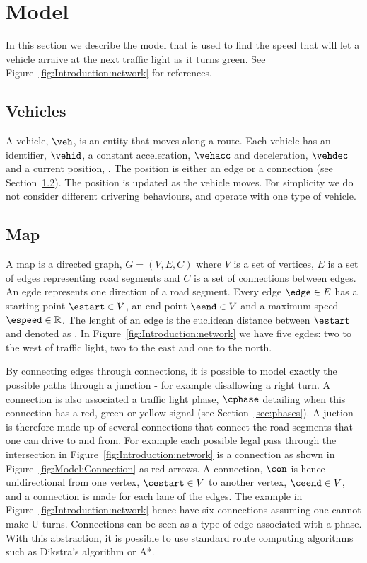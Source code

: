 \section{Model}\label{sec:Model}
In this section we describe the model that is used to find the speed that will let a vehicle arraive at the next traffic light as it turns green.
See Figure~\ref{fig:Introduction:network} for references.

\subsection{Vehicles}
A vehicle, $\veh$, is an entity that moves along a route.
Each vehicle has an identifier, $\vehid$, a constant acceleration, $\vehacc$ and deceleration, $\vehdec$ and a current position, \vehpos. 
The position is either an edge or a connection (see Section~\ref{sec:map}).
The position is updated as the vehicle moves.
For simplicity we do not consider different drivering behaviours, and operate with one type of vehicle. 

\subsection{Map}\label{sec:map}
A map is a directed graph, $G = (V, E, C)$ where $V$ is a set of vertices, $E$ is a set of edges representing road segments and $C$ is a set of connections between edges.
An egde represents one direction of a road segment.
Every edge $\edge\in E$ has a starting point $\estart\in V$, an end point $\eend\in V$ and a maximum speed $\espeed\in\mathbb{R}$. 
The lenght of an edge is the euclidean distance between $\estart$ and \eend denoted as \elength.
In Figure~\ref{fig:Introduction:network} we have five egdes: two to the west of traffic light, two to the east and one to the north.

By connecting edges through connections, it is possible to model exactly the possible paths through a junction - for example disallowing a right turn.
A connection is also associated a traffic light phase, $\cphase$ detailing when this connection has a red, green or yellow signal (see Section~\ref{sec:phases}).
A juction is therefore made up of several connections that connect the road segments that one can drive to and from.
For example each possible legal pass through the intersection in Figure~\ref{fig:Introduction:network} is a connection as shown in Figure~\ref{fig:Model:Connection} as red arrows. 
A connection, $\con$ is hence unidirectional from one vertex, $\cestart\in V$ to another vertex, $\ceend \in V$, and a connection is made for each lane of the edges.
The example in Figure~\ref{fig:Introduction:network} hence have six connections assuming one cannot make U-turns.
Connections can be seen as a type of edge associated with a phase.
With this abstraction, it is possible to use standard route computing algorithms such as Dikstra's algorithm or A*.

